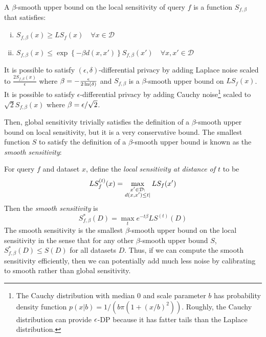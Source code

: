 \begin{theorem}
\label{thm:smooth}
A $\beta$-smooth upper bound on the local sensitivity of query $f$ is a function $S_{f, \beta}$ that satisfies:
\vspace{-0.2in}
\begin{enumerate}[(i)]
	\item $S_{f, \beta}(x) \geq LS_f(x) \quad \forall x \in \mathcal{D}$
	\item $S_{f, \beta} (x) \leq \exp\left\{- \beta d(x, x') \right\} S_{f, \beta}(x') \quad \forall x, x' \in \mathcal{D}$
\end{enumerate}
\vspace{-0.2in}
It is possible to satisfy $(\epsilon, \delta)$-differential privacy by adding Laplace noise scaled to $\frac{2S_{f,\beta}(x)}{\epsilon}$ where $\beta = -\frac{\epsilon}{2 \ln(\delta)}$ and $S_{f, \beta}$ is a $\beta$-smooth upper bound on $LS_f(x)$. It is possible to satisfy $\epsilon$-differential privacy by adding Cauchy noise\footnote{The Cauchy distribution with median $0$ and scale parameter $b$ has probability density function $p(x|b) = 1/(b \pi(1+(x/b)^2 ) )$. Roughly, the Cauchy distribution can provide $\epsilon$-DP because it has fatter tails than the Laplace distribution.} scaled to $\sqrt{2}S_{f, \beta}(x)$ where $\beta = \epsilon/\sqrt{2}$.
\end{theorem}

 Then, global sensitivity trivially satisfies the definition of a $\beta$-smooth upper bound on local sensitivity, but it is a very conservative bound. The smallest function $S$ to satisfy the definition of a $\beta$-smooth upper bound is known as the \emph{smooth sensitivity}:
\begin{definition}
\label{def:smooth}
For query $f$ and dataset $x$, define the \emph{local sensitivity at distance of $t$} to be
$$LS_f^{(t)}(x) = \max_{\substack{x' \in \mathcal{D}:\\ d(x, x') \leq t|}} LS_f(x')$$
Then the \emph{smooth sensitivity} is
$$S^*_{f, \beta}(D) = \max_{t} e^{-t \beta}  LS^{(t)}(D)$$
The smooth sensitivity is the smallest $\beta$-smooth upper bound on the local sensitivity in the sense that for any other $\beta$-smooth upper bound $S$, $S^*_{f, \beta}(D) \leq S(D)$ for all datasets $D$. Thus, if we can compute the smooth sensitivity efficiently, then we can potentially add much less noise by calibrating to smooth rather than global sensitivity.
\end{definition}

